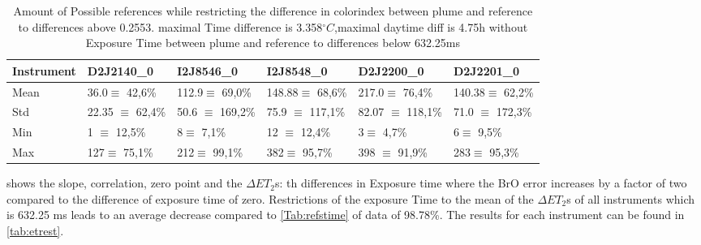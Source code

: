 \begin{table}
	\begin{tabular}{|p{2cm}|p{2cm}|p{2cm}|p{2cm}|p{2cm}|p{2cm}|}
		Instrument	&D2J2140\_0&I2J8546\_0& I2J8548\_0&D2J2200\_0&D2J2201\_0\\
		\toprule
		Mean&
		36.0$\equiv$ 42,6\%&	112.9$\equiv$ 69,0\%&
		148.88$\equiv$ 68,6\%&	217.0$\equiv$ 76,4\%&	140.38$\equiv$ 62,2\%\\
		\midrule
		Std&
		22.35 $\equiv$	62,4\%&
		50.6 $\equiv$	169,2\% &
		75.9 $\equiv$	117,1\%&
		82.07 $\equiv$	118,1\% &
		71.0 $\equiv$	172,3\% \\
		\midrule
		Min&
		1 $\equiv$	    12,5\%  &
		8$\equiv$	7,1\%  &
		12 $\equiv$	12,4\%  &
		3$\equiv$	4,7\%   &
		6$\equiv$	9,5\%  \\
		\midrule
		Max
		&127$\equiv$	75,1\%
		&212$\equiv$	99,1\%
		&382$\equiv$	95,7\%
		&398 $\equiv$	91,9\%
		&283$\equiv$	95,3\%\\
		\bottomrule
	\end{tabular}
	\caption{Amount of Possible references while restricting the difference in colorindex  between plume and reference to differences above 0.2553. maximal Time difference is 3.358$^{\circ}C$,maximal daytime diff is 4.75h without Exposure Time  between plume and reference to differences below 632.25ms}
\end{table}	

 shows the slope, correlation, zero point and the $\Delta ET_{2}$s: th differences in Exposure time where the BrO error increases by a factor of two compared to the difference of exposure time of zero.
Restrictions of the exposure Time to the mean of the $\Delta ET_{2}$s of all instruments which is 632.25 ms leads to an average decrease compared to \cref{Tab:refstime} of data of 98.78\%. The results for each instrument can be found in \cref{tab:etrest}.


